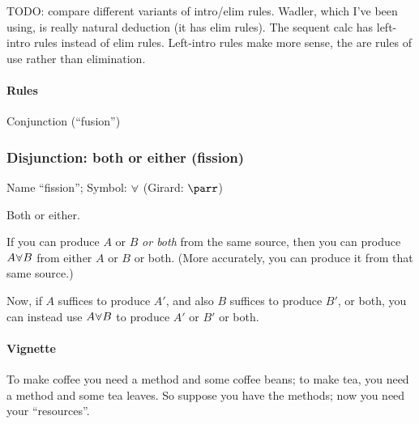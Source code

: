 \documentclass{article}
\begin{document}

TODO: compare different variants of intro/elim rules. Wadler, which
I've been using, is really natural deduction (it has elim rules). The
sequent calc has left-intro rules instead of elim rules. Left-intro
rules make more sense, the are rules of use rather than elimination.

\paragraph{Rules} Conjunction (``fusion'')


\subsubsection{Disjunction: both or either (fission)}

Name ``fission''; Symbol: \(\fission\) (Girard: \(\parr\))

Both or either.

If you can produce \(A\) or \(B\) \textit{or both} from the same
source, then you can produce \(A\fission B\) from either \(A\) or \(B\)
or both. (More accurately, you can produce it from that same source.)

Now, if \(A\) suffices to produce \(A'\), and also \(B\) suffices to
produce \(B'\), or both, you can instead use \(A\fission B\) to produce
\(A'\) or \(B'\) or both.

\paragraph{Vignette\\}

To make coffee you need a method and some coffee beans; to make tea,
you need a method and some tea leaves. So suppose you have the
methods; now you need your ``resources''.
\end{document}
